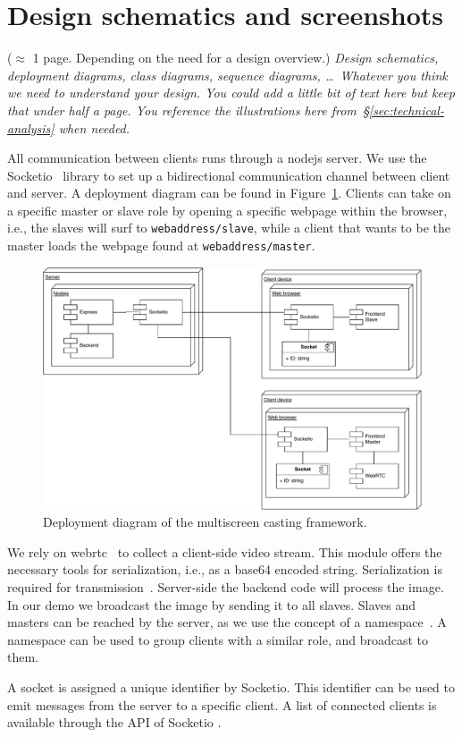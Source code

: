 \documentclass[a4paper,11pt]{article}
\newcommand{\note}[1]{{\colorbox{yellow!40!white}{#1}}}
\newcommand{\exampletext}[1]{{\color{blue!60!black}#1}}
\begin{document}
\section{Design schematics and screenshots}\label{sec:schematic}

\note{($\approx$ 1 page. Depending on the need for a design overview.)}
\exampletext{\textit{Design schematics, deployment diagrams, class diagrams, sequence diagrams, \ldots\ Whatever you think we need to understand your design. You could add a little bit of text here but keep that under half a page. You reference the illustrations here from~\S\ref{sec:technical-analysis} when needed.}}

\exampletext{All communication between clients runs through a nodejs server. We use the Socketio~\cite{socketio} library to set up a bidirectional communication channel between client and server. A deployment diagram can be found in Figure~\ref{fig:deployment}. Clients can take on a specific master or slave role by opening a specific webpage within the browser, i.e., the slaves will surf to \texttt{webaddress/slave}, while a client that wants to be the master loads the webpage found at \texttt{webaddress/master}.}

\begin{figure}[h!]
	\centering
	\includegraphics[width=\textwidth]{figures/deployment}
	\caption{Deployment diagram of the multiscreen casting framework.} 
	\label{fig:deployment}
\end{figure}

\exampletext{We rely on webrtc~\cite{website:webrtc} to collect a client-side video stream. This module offers the necessary tools for serialization, i.e., as a base64 encoded string. Serialization is required for transmission~\cite{website:serialization}. Server-side the backend code will process the image. In our demo we broadcast the image by sending it to all slaves. Slaves and masters can be reached by the server, as we use the concept of a namespace~\cite{website:namespaces}. A namespace can be used to group clients with a similar role, and broadcast to them. 

A socket is assigned a unique identifier by Socketio. This identifier can be used to emit messages from the server to a specific client. A list of connected clients is available through the API of Socketio \cite{website:socketio-clients}.}
\end{document}
